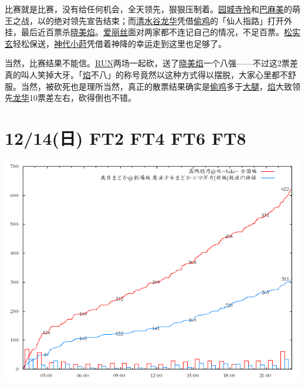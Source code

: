 比赛就是比赛，没有给任何机会，全天领先，狠狠压制着。\uline{园城寺怜}和\uline{巴麻美}的萌王之战，以的绝对领先宣告结束；而\uline{清水谷龙华}凭借\uline{偷鸡}的「仙人指路」打开外挂，最后近百票杀\uline{晓美焰}。\uline{爱丽丝}面对两家都不连记自己的情况，不足百票。\uline{松实玄}轻松保送，\uline{神代小莳}凭借着神降的幸运走到这里也足够了。

当然，比赛结果不能信。\uline{RUN}两场一起砍，送了\uline{晓美焰}一个八强——不过这2票差真的叫人笑掉大牙。「\uline{焰}不八」的称号竟然以这种方式得以摆脱，大家心里都不舒服。当然，被砍死也是理所当然，真正的散票结果确实是\uline{偷鸡}多于\uline{大腿}，\uline{焰}大致领先\uline{龙华}10票差左右，砍得倒也不错。
\clearpage
\section{12/14(日) FT2 FT4 FT6 FT8}


\includegraphics[width=.5\textwidth]{images/graph1214c.png}

